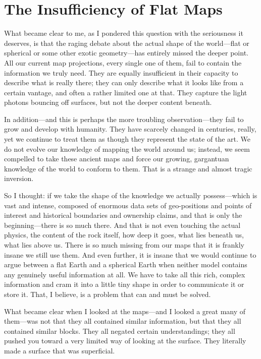 \chapter{The Insufficiency of Flat Maps}

What became clear to me, as I pondered this question with the seriousness it deserves, is that the raging debate about the actual shape of the world—flat or spherical or some other exotic geometry—has entirely missed the deeper point. All our current map projections, every single one of them, fail to contain the information we truly need. They are equally insufficient in their capacity to describe what is really there; they can only describe what it looks like from a certain vantage, and often a rather limited one at that. They capture the light photons bouncing off surfaces, but not the deeper content beneath.

In addition—and this is perhaps the more troubling observation—they fail to grow and develop with humanity. They have scarcely changed in centuries, really, yet we continue to treat them as though they represent the state of the art. We do not evolve our knowledge of mapping the world around us; instead, we seem compelled to take these ancient maps and force our growing, gargantuan knowledge of the world to conform to them. That is a strange and almost tragic inversion.

So I thought: if we take the shape of the knowledge we actually possess—which is vast and intense, composed of enormous data sets of geo-positions and points of interest and historical boundaries and ownership claims, and that is only the beginning—there is so much there. And that is not even touching the actual physics, the content of the rock itself, how deep it goes, what lies beneath us, what lies above us. There is so much missing from our maps that it is frankly insane we still use them. And even further, it is insane that we would continue to argue between a flat Earth and a spherical Earth when neither model contains any genuinely useful information at all. We have to take all this rich, complex information and cram it into a little tiny shape in order to communicate it or store it. That, I believe, is a problem that can and must be solved.

What became clear when I looked at the maps—and I looked a great many of them—was not that they all contained similar information, but that they all contained similar blocks. They all negated certain understandings; they all pushed you toward a very limited way of looking at the surface. They literally made a surface that was superficial.


